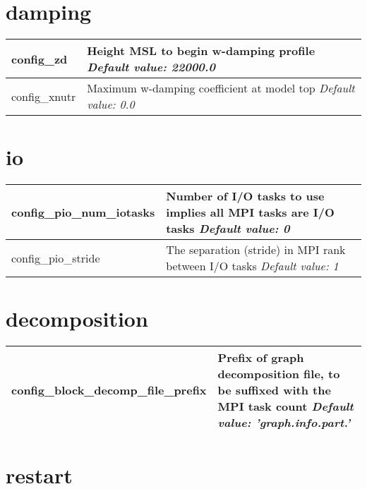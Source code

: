 \section{damping}

{\small
\begin{longtable}{|p{2.0in} |p{4.25in}|}
 \hline
   config\_zd & Height MSL to begin w-damping profile \newline 
   {\em Default value: 22000.0} \\ \hline

   config\_xnutr & Maximum w-damping coefficient at model top \newline 
   {\em Default value: 0.0} \\ \hline
\end{longtable}
}

\section{io}

{\small
\begin{longtable}{|p{1.75in} |p{4.5in}|}
 \hline
   config\_pio\_num\_iotasks        & Number of I/O tasks to use \hfill\break 0 implies all MPI tasks are I/O tasks \newline 
   {\em Default value: 0} \\ \hline

   config\_pio\_stride        & The separation (stride) in MPI rank between I/O tasks \newline 
   {\em Default value: 1} \\ \hline
   
\end{longtable}
}

\section{decomposition}

{\small
\begin{longtable}{|p{2.0in} |p{4.25in}|}
 \hline
 
   config\_block\_decomp\_file\_prefix & Prefix of graph decomposition file, to be suffixed with the MPI task count \newline 
   {\em Default value: 'graph.info.part.'} \\ \hline

\end{longtable}
}

\section{restart}

